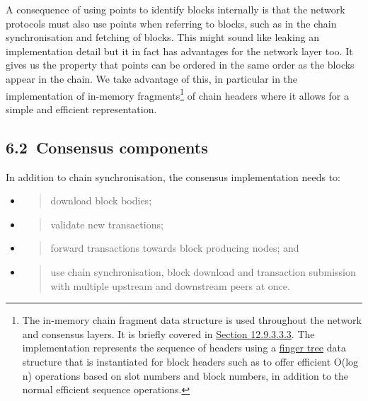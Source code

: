 \documentclass[11pt,a4paper]{article}
\begin{document}
A consequence of using points to identify blocks internally is that the
network protocols must also use points when referring to blocks, such as
in the chain synchronisation and fetching of blocks. This might sound
like leaking an implementation detail but it in fact has advantages for
the network layer too. It gives us the property that points can be
ordered in the same order as the blocks appear in the chain. We take
advantage of this, in particular in the implementation of in-memory
fragments\footnote{The in-memory chain fragment data structure is used
  throughout the network and consensus layers. It is briefly covered in
  \protect\hyperlink{chain-fragments}{{Section 12.9.3.3.3}}. The
  implementation represents the sequence of headers using a
  \href{http://www.staff.city.ac.uk/~ross/papers/FingerTree.html}{{finger
  tree}} data structure that is instantiated for block headers such as
  to offer efficient O(log n) operations based on slot numbers and block
  numbers, in addition to the normal efficient sequence operations.} of
chain headers where it allows for a simple and efficient representation.

\hypertarget{consensus-components}{%
\subsection{​6.2​~Consensus components}\label{consensus-components}}

In addition to chain synchronisation, the consensus implementation needs
to:

\begin{itemize}
\item
  \begin{quote}
  download block bodies;
  \end{quote}
\item
  \begin{quote}
  validate new transactions;
  \end{quote}
\item
  \begin{quote}
  forward transactions towards block producing nodes; and
  \end{quote}
\item
  \begin{quote}
  use chain synchronisation, block download and transaction submission
  with multiple upstream and downstream peers at once.
  \end{quote}
\end{itemize}
\end{document}
